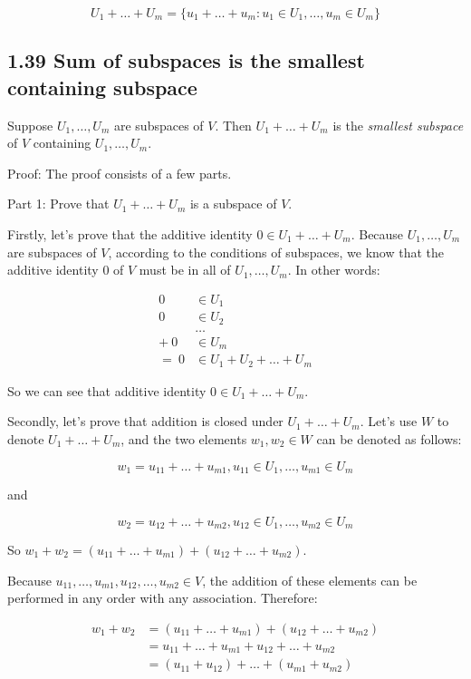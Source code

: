 \documentclass[12pt, letterpaper, oneside]{book}
\begin{document}
\[
U_1 + \ldots + U_m = \{ u_1 + \ldots + u_m: u_1 \in U_1, \ldots, u_m \in U_m \}
\]

\subsection{1.39 Sum of subspaces is the smallest containing subspace}

Suppose $U_1, \ldots, U_m$ are subspaces of $V$. Then $U_1 + \ldots + U_m$ is
the \textit{smallest subspace} of $V$ containing $U_1, \ldots, U_m$.

Proof: The proof consists of a few parts.

Part 1: Prove that $U_1 + \ldots + U_m$ is a subspace of $V$.

Firstly, let's prove that the additive identity $0 \in U_1 + \ldots + U_m$.
Because $U_1, \ldots, U_m$ are subspaces of $V$, according to the conditions of
subspaces, we know that the additive identity $0$ of $V$ must be in all of
$U_1, \ldots, U_m$. In other words:

\begin{align*}
      0 & \in U_1 \\
      0 & \in U_2 \\
        & \ldots \\
  + \ 0 & \in U_m \\
  = \ 0 & \in U_1 + U_2 + \ldots + U_m
\end{align*}

So we can see that additive identity $0 \in U_1 + \ldots + U_m$.

Secondly, let's prove that addition is closed under $U_1 + \ldots + U_m$. Let's
use $W$ to denote $U_1 + \ldots + U_m$, and the two elements $w_1, w_2 \in W$
can be denoted as follows:

\[
  w_1 = u_{11} + \ldots + u_{m1}, u_{11} \in U_1, \ldots, u_{m1} \in U_m
\]

and

\[
  w_2 = u_{12} + \ldots + u_{m2}, u_{12} \in U_1, \ldots, u_{m2} \in U_m
\]

So $w_1 + w_2 = (u_{11} + \ldots + u_{m1}) + (u_{12} + \ldots + u_{m2})$.

Because $u_{11}, \ldots, u_{m1}, u_{12}, \ldots, u_{m2} \in V$, the addition of
these elements can be performed in any order with any association. Therefore:

\begin{align*}
  w_1 + w_2 & = (u_{11} + \ldots + u_{m1}) + (u_{12} + \ldots + u_{m2}) \\
            & = u_{11} + \ldots + u_{m1} + u_{12} + \ldots + u_{m2} \\
            & = (u_{11} + u_{12}) + \ldots + (u_{m1} + u_{m2})
\end{align*}
\end{document}
